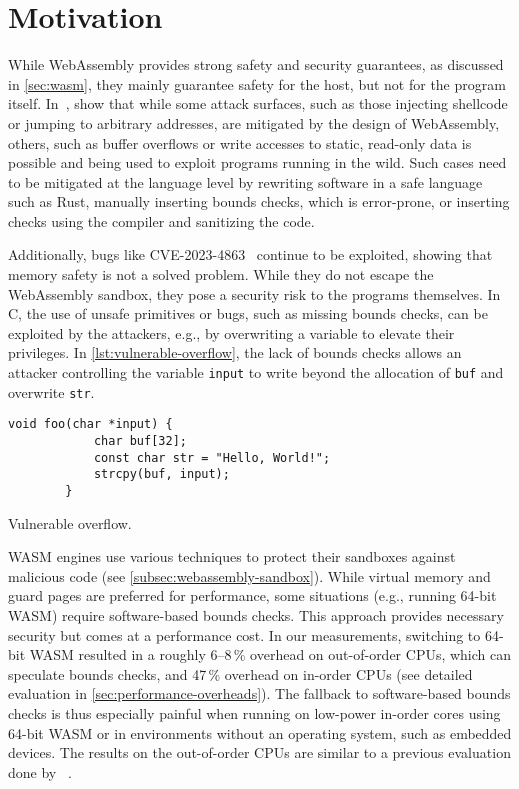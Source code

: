 \chapter{Motivation}
\label{ch:motivation}

While WebAssembly provides strong safety and security guarantees, as discussed in \cref{sec:wasm}, they mainly guarantee safety for the host, but not for the program itself.
In~\cite{lehmann2020everything}, \citeauthor*{lehmann2020everything} show that while some attack surfaces, such as those injecting shellcode or jumping to arbitrary addresses, are mitigated by the design of WebAssembly, others, such as buffer overflows or write accesses to static, read-only data is possible and being used to exploit programs running in the wild.
Such cases need to be mitigated at the language level by rewriting software in a safe language such as Rust, manually inserting bounds checks, which is error-prone, or inserting checks using the compiler and sanitizing the code.

Additionally, bugs like {CVE-2023-4863}~\cite{CVE-2023-4863} continue to be exploited, showing that memory safety is not a solved problem.
While they do not escape the WebAssembly sandbox, they pose a security risk to the programs themselves.
In C, the use of unsafe primitives or bugs, such as missing bounds checks, can be exploited by the attackers, e.g., by overwriting a variable to elevate their privileges.
In \cref{lst:vulnerable-overflow}, the lack of bounds checks allows an attacker controlling the variable \texttt{input} to write beyond the allocation of \texttt{buf} and overwrite \texttt{str}.

\begin{lstfloat}[h]
    \centering
    \begin{lstlisting}[frame=h,style=customc,label={lst:vulnerable-overflow-inner}]
        void foo(char *input) {
            char buf[32];
            const char str = "Hello, World!";
            strcpy(buf, input);
        }
    \end{lstlisting}
    \caption{Vulnerable overflow.}
    \label{lst:vulnerable-overflow}
\end{lstfloat}

\Ac{WASM} engines use various techniques to protect their sandboxes against malicious code (see \cref{subsec:webassembly-sandbox}).
While virtual memory and guard pages are preferred for performance, some situations (e.g., running 64-bit \ac{WASM}) require software-based bounds checks.
This approach provides necessary security but comes at a performance cost.
In our measurements, switching to 64-bit \ac{WASM} resulted in a roughly 6--8\,\% overhead on out-of-order CPUs, which can speculate bounds checks, and 47\,\% overhead on in-order CPUs (see detailed evaluation in \cref{sec:performance-overheads}).
The fallback to software-based bounds checks is thus especially painful when running on low-power in-order cores using 64-bit \ac{WASM} or in environments without an operating system, such as embedded devices.
The results on the out-of-order CPUs are similar to a previous evaluation done by \citeauthor*{szewczyk2022leaps}~\cite{szewczyk2022leaps}.

